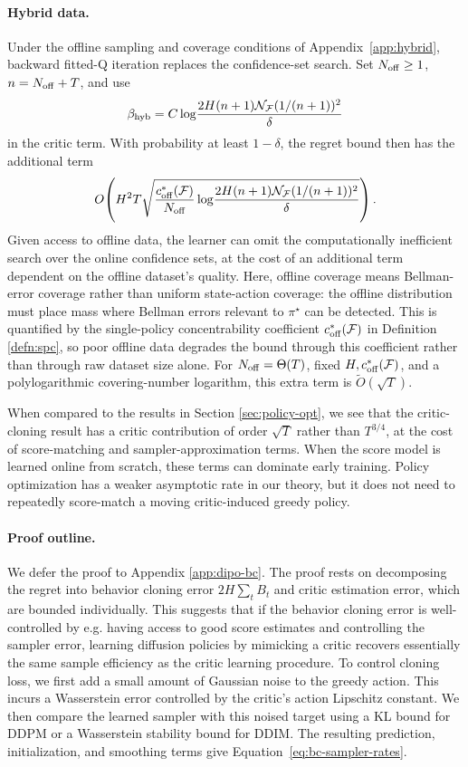 \paragraph{Hybrid data.} Under the offline sampling and coverage conditions of Appendix~\ref{app:hybrid}, backward fitted-Q iteration replaces the confidence-set search. Set $N_{{\operatorname{off}}}\ge1$, $n=N_{{\operatorname{off}}}+T$, and use
\[
 \beta_{\rm hyb}=C\log\!\frac{2H(n+1){\mathcal{N}}_{\mathcal{F}}(1/(n+1))^2}{\delta}
\]
in the critic term. With probability at least $1-\delta$, the regret bound then has the additional term
\[
 O\!\left(H^2T\sqrt{\frac{c_{{\operatorname{off}}}^*({\mathcal{F}})}{N_{{\operatorname{off}}}}
       \log\!\frac{2H(n+1){\mathcal{N}}_{\mathcal{F}}(1/(n+1))^2}{\delta}}\right).
\]
Given access to offline data, the learner can omit the computationally inefficient search over the online confidence sets, at the cost of an additional term dependent on the offline dataset's quality. Here, offline coverage means Bellman-error coverage rather than uniform state-action coverage: the offline distribution must place mass where Bellman errors relevant to $\pi^\star$ can be detected. This is quantified by the single-policy concentrability coefficient $c_{{\operatorname{off}}}^*({\mathcal{F}})$ in Definition \ref{defn:spc}, so poor offline data degrades the bound through this coefficient rather than through raw dataset size alone. For $N_{{\operatorname{off}}}=\Theta(T)$, fixed $H,c_{{\operatorname{off}}}^*({\mathcal{F}})$, and a polylogarithmic covering-number logarithm, this extra term is $\widetilde O(\sqrt T)$.

When compared to the results in Section \ref{sec:policy-opt}, we see that the critic-cloning result has a critic contribution of order $\sqrt{T}$ rather than $T^{3/4}$, at the cost of score-matching and sampler-approximation terms. When the score
model is learned online from scratch, these terms can dominate early training. Policy optimization
has a weaker asymptotic rate in our theory, but it does not need to repeatedly score-match a moving
critic-induced greedy policy.

\paragraph{Proof outline.} We defer the proof to Appendix \ref{app:dipo-bc}. The proof rests on decomposing the regret into behavior cloning error $2H\sum_t B_t$ and critic estimation error, which are bounded individually. This suggests that if the behavior cloning error is well-controlled by e.g. having access to good score estimates and controlling the sampler error, learning diffusion policies by mimicking a critic recovers essentially the same sample efficiency as the critic learning procedure. To control cloning loss, we first add a small amount of Gaussian noise to the greedy action. This incurs a Wasserstein error controlled by the critic's action Lipschitz constant. We then compare the learned sampler with this noised target using a KL bound for DDPM or a Wasserstein stability bound for DDIM. The resulting prediction, initialization, and smoothing terms give Equation~\ref{eq:bc-sampler-rates}.

